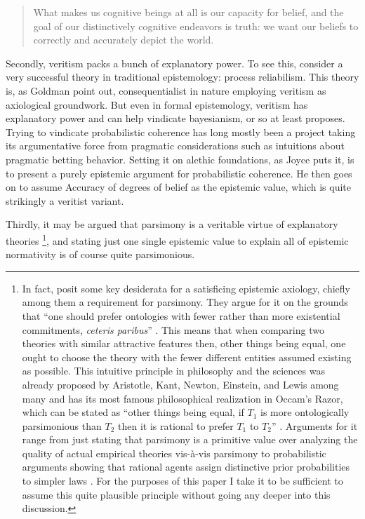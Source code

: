 \documentclass[12pt,numbers=noenddot]{scrartcl}
\begin{document}
\begin{quote}
What makes us cognitive beings at all is our capacity for belief, and the goal of our distinctively cognitive endeavors is truth: we want our beliefs to correctly and accurately depict the world. \textcite[7]{Bonjour1985}
\end{quote}

Secondly, veritism packs a bunch of explanatory power. To see this, consider a very successful theory in traditional epistemology: process reliabilism. This theory is, as Goldman point out, consequentialist in nature \autocite{Goldman2002-GOLTUO-2} employing veritism as axiological groundwork. But even in formal epistemology, veritism has explanatory power and can help vindicate bayesianism, or so at least \textcite{Joyce2009-JOYAAC} proposes. Trying to vindicate probabilistic coherence has long mostly been a project taking its argumentative force from pragmatic considerations such as intuitions about pragmatic betting behavior. Setting it on alethic foundations, as Joyce puts it, is to present a purely epistemic argument for probabilistic coherence. He then goes on to assume Accuracy of degrees of belief as the epistemic value, which is quite strikingly a veritist variant.

Thirdly, it may be argued that parsimony is a veritable virtue of explanatory theories \footnote{In fact, \textcite[342]{Ahlstrom-Vij2013} posit some key desiderata for a satisficing epistemic axiology, chiefly among them a requirement for parsimony. They argue for it on the grounds that “one should prefer ontologies with fewer rather than more existential commitments, \emph{ceteris paribus}” \autocite{Ahlstrom-Vij2013}. This means that when comparing two theories with similar attractive features then, other things being equal, one ought to choose the theory with the fewer different entities assumed existing as possible. This intuitive principle in philosophy and the sciences was already proposed by Aristotle, Kant, Newton, Einstein, and Lewis among many \autocite[3]{sep-simplicity} and has its most famous philosophical realization in Occam's Razor, which can be stated as “other things being equal, if $T_1$ is more ontologically parsimonious than $T_2$ then it is rational to prefer $T_1$ to $T_2$” \autocite[7]{sep-simplicity}. Arguments for it range from just stating that parsimony is a primitive value over analyzing the quality of actual empirical theories vis-à-vis parsimony to probabilistic arguments showing that rational agents assign distinctive prior probabilities to simpler laws \autocite[11-26]{sep-simplicity}. For the purposes of this paper I take it to be sufficient to assume this quite plausible principle without going any deeper into this discussion.},
and stating just one single epistemic value to explain all of epistemic normativity is of course quite parsimonious.
\end{document}
